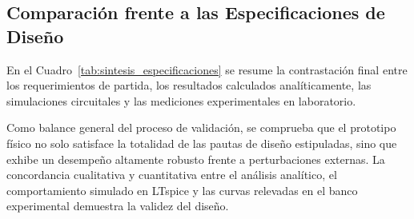 \subsection{Comparación frente a las Especificaciones de Diseño}
En el Cuadro~\ref{tab:sintesis_especificaciones} se resume la contrastación final entre los requerimientos de partida, los resultados calculados analíticamente, las simulaciones circuitales y las mediciones experimentales en laboratorio.

\begin{table}[!ht]
  \centering
  \caption{Síntesis comparativa final: especificaciones impuestas vs.\ cálculos analíticos, simulación en LTspice y mediciones de laboratorio.}
  \label{tab:sintesis_especificaciones}
\end{table}

Como balance general del proceso de validación, se comprueba que el prototipo
físico no solo satisface la totalidad de las pautas de diseño estipuladas, sino
que exhibe un desempeño altamente robusto frente a perturbaciones externas. La
concordancia cualitativa y cuantitativa entre el análisis analítico, el
comportamiento simulado en LTspice y las curvas relevadas en el banco
experimental demuestra la validez del diseño.
